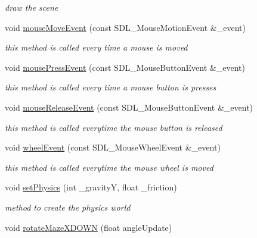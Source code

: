 \begin{DoxyCompactItemize}
\begin{DoxyCompactList}\small\item\em draw the scene \item\end{DoxyCompactList}\item 
void \hyperlink{classNGLDraw_a7950c9e9bfd16dc9b6075881396df876}{mouseMoveEvent} (const SDL\_\-MouseMotionEvent \&\_\-event)
\begin{DoxyCompactList}\small\item\em this method is called every time a mouse is moved \item\end{DoxyCompactList}\item 
void \hyperlink{classNGLDraw_a1b20896f4aac3cddd5ea2f977410a19f}{mousePressEvent} (const SDL\_\-MouseButtonEvent \&\_\-event)
\begin{DoxyCompactList}\small\item\em this method is called every time a mouse button is presses \item\end{DoxyCompactList}\item 
void \hyperlink{classNGLDraw_aa41eba2e6fd12011cdd62a7db8f7f84e}{mouseReleaseEvent} (const SDL\_\-MouseButtonEvent \&\_\-event)
\begin{DoxyCompactList}\small\item\em this method is called everytime the mouse button is released \item\end{DoxyCompactList}\item 
void \hyperlink{classNGLDraw_a8782a682c3a362baa3b18882f49c95ed}{wheelEvent} (const SDL\_\-MouseWheelEvent \&\_\-event)
\begin{DoxyCompactList}\small\item\em this method is called everytime the mouse wheel is moved \item\end{DoxyCompactList}\item 
void \hyperlink{classNGLDraw_af568498c828386ab732bbbde37ccf607}{setPhysics} (int \_\-gravityY, float \_\-friction)
\begin{DoxyCompactList}\small\item\em method to create the physics world \item\end{DoxyCompactList}\item 
void \hyperlink{classNGLDraw_a9c926f68084a0c0635bf46fe19bc253c}{rotateMazeXDOWN} (float angleUpdate)

\end{DoxyCompactItemize}
